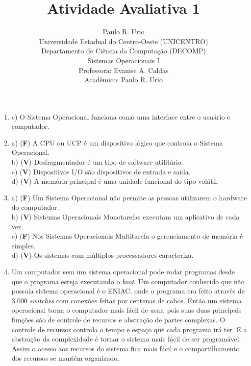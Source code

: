 \documentclass[12pt,a4paper]{article}
\title{Atividade Avaliativa 1}
\author{Paulo R. Urio \\
        Universidade Estadual do Centro-Oeste (UNICENTRO)\\
        Departamento de Ciência da Computação (DECOMP)\\
        Sistemas Operacionais I\\
        Professora: Evanise A. Caldas\\
        Acadêmico: Paulo R. Urio}
\begin{document}
\fancyhf{}
 
\rfoot{\thepage}

\begin{enumerate}
\item
c) O Sistema Operacional funciona como uma interface entre o usuário e
computador.

\item
a) (\textbf{F}) A CPU ou UCP é um dispositivo lógico que controla o Sistema Operacional.\\
b) (\textbf{V}) Desfragmentador é um tipo de software utilitário.\\
c) (\textbf{V}) Dispositivos I/O são dispositivos de entrada e saída.\\
d) (\textbf{V}) A memória principal é uma unidade funcional do tipo volátil.\\

\item
a) (\textbf{F}) Um Sistema Operacional não permite as pessoas utilizarem o hardware do
computador.\\
b) (\textbf{V}) Sistemas Operacionais Monotarefas executam um aplicativo de cada vez.\\
c) (\textbf{F}) Nos Sistemas Operacionais Multitarefa o gerenciamento de memória é
simples.\\
d) (\textbf{V}) Os sistemas com múltiplos processadores caracteriza.

\item
Um computador sem um sistema operacional pode rodar programas desde que o 
programa esteja executando o \textsl{boot}. Um computador conhecido que
não possuía sistema operacional é o ENIAC, onde o programa era feito através
de 3.000 \textsl{switches} com conexões feitas por centenas de cabos.
Então um sistema operacional torna o computador mais fácil de usar, pois suas
duas principais funções são de controle de recursos e abstração de partes
complexas. O controle de recursos controla o tempo e espaço que cada programa
irá ter. E a abstração da complexidade é tornar o sistema mais fácil de 
ser programável. Assim o acesso aos recursos do sistema fica mais fácil e o
compartilhamento dos recursos se mantém organizado.


\end{enumerate}
\end{document}
